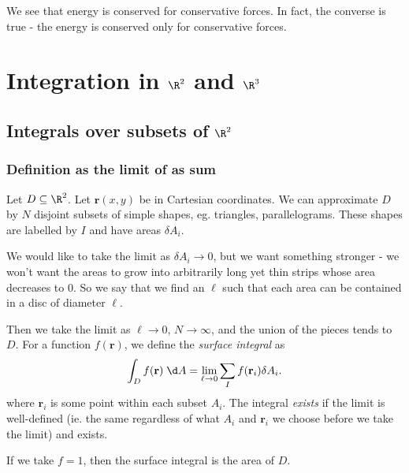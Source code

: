 \documentclass[a4paper]{article}
\begin{document}
We see that energy is conserved for conservative forces. In fact, the converse is true - the energy is conserved only for conservative forces.

\section{Integration in \texorpdfstring{$\R^2$ and $\R^3$}{R2 and R3}}
\subsection{Integrals over subsets of \texorpdfstring{$\R^2$}{R2}}
\subsubsection{Definition as the limit of as sum}
\begin{defi}
  Let $D\subseteq \R^2$. Let $\mathbf{r}(x, y)$ be in Cartesian coordinates. We can approximate $D$ by $N$ disjoint subsets of simple shapes, eg. triangles, parallelograms. These shapes are labelled by $I$ and have areas $\delta A_i$. \begin{center}
  \end{center}
  We would like to take the limit as $\delta A_i \to 0$, but we want something stronger - we won't want the areas to grow into arbitrarily long yet thin strips whose area decreases to 0. So we say that we find an $\ell$ such that each area can be contained in a disc of diameter $\ell$. 

  Then we take the limit as $\ell \to 0$, $N\to \infty$, and the union of the pieces tends to $D$. For a function $f(\mathbf{r})$, we define the \emph{surface integral} as
  \[
    \int_D f(\mathbf{r}) \;\d A = \lim_{\ell\to 0}\sum _I f(\mathbf{r}_i)\delta A_i.
  \]
  where $\mathbf{r}_i$ is some point within each subset $A_i$. The integral \emph{exists} if the limit is well-defined (ie. the same regardless of what $A_i$ and $\mathbf{r}_i$ we choose before we take the limit) and exists.
\end{defi}
If we take $f = 1$, then the surface integral is the area of $D$.
\end{document}
